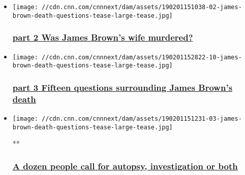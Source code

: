 \begin{itemize}
\item
  \href{https://www.cnn.com/interactive/2019/02/us/james-brown-death-questions/chapter_02.html}{}

  \texttt{[image: //cdn.cnn.com/cnnnext/dam/assets/190201151038-02-james-brown-death-questions-tease-large-tease.jpg]}

  \hypertarget{part-2-was-james-browns-wife-murdered}{%
  \subsubsection{\texorpdfstring{\href{https://www.cnn.com/interactive/2019/02/us/james-brown-death-questions/chapter_02.html}{part
  2 Was James Brown's wife
  murdered?}}{part 2 Was James Brown's wife murdered?}}\label{part-2-was-james-browns-wife-murdered}}
\item
  \href{https://www.cnn.com/interactive/2019/02/us/james-brown-death-questions/chapter_03.html}{}

  \texttt{[image: //cdn.cnn.com/cnnnext/dam/assets/190201152822-10-james-brown-death-questions-tease-large-tease.jpg]}

  \hypertarget{part-3-fifteen-questions-surrounding-james-browns-death}{%
  \subsubsection{\texorpdfstring{\href{https://www.cnn.com/interactive/2019/02/us/james-brown-death-questions/chapter_03.html}{part
  3 Fifteen questions surrounding James Brown's
  death}}{part 3 Fifteen questions surrounding James Brown's death}}\label{part-3-fifteen-questions-surrounding-james-browns-death}}
\item
  \href{/videos/us/2019/02/04/james-brown-death-orig-nws.cnn}{}

  \texttt{[image: //cdn.cnn.com/cnnnext/dam/assets/190201151231-03-james-brown-death-questions-tease-large-tease.jpg]}

  **

  \hypertarget{a-dozen-people-call-for-autopsy-investigation-or-both}{%
  \subsubsection{\texorpdfstring{\href{/videos/us/2019/02/04/james-brown-death-orig-nws.cnn}{A
  dozen people call for autopsy, investigation or
  both}}{A dozen people call for autopsy, investigation or both}}\label{a-dozen-people-call-for-autopsy-investigation-or-both}}
\end{itemize}

